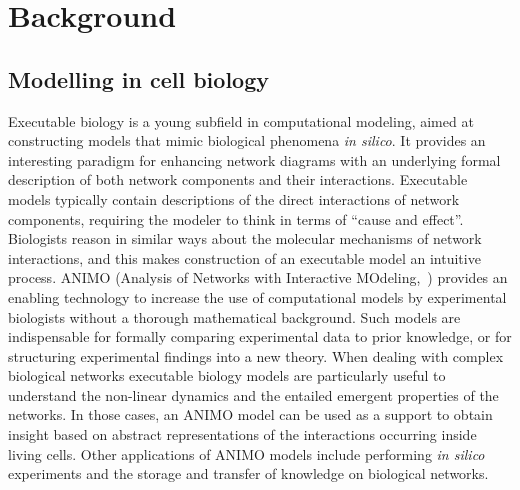 \documentclass{bmcart}
\begin{document}
\section*{Background}\label{sec:introduction}
\subsection*{Modelling in cell biology}
Executable biology is a young subfield in computational modeling, aimed at constructing models that mimic
biological phenomena \emph{in silico}. It provides an interesting paradigm for enhancing network
diagrams with an underlying formal description of both network components and their interactions.
Executable models typically contain descriptions of the direct interactions of network components,
requiring the modeler to think in terms of
``cause and effect''. Biologists reason in similar ways about the molecular mechanisms of network
interactions, and this makes construction of an executable model an intuitive process.
ANIMO (Analysis of Networks with Interactive MOdeling,~\cite{animo-ieee,animo-gene})
provides an enabling technology to increase the use of computational models by experimental
 biologists without a thorough mathematical background. Such models are indispensable for formally
comparing experimental data to prior knowledge, or for structuring experimental findings into a
new theory.
When dealing with complex biological networks executable biology models are particularly useful
to understand the non-linear dynamics and the entailed emergent properties of the networks.
In those cases, an ANIMO model can be used as a support to obtain insight based on abstract
representations of the interactions occurring inside living cells.
Other applications of ANIMO models include performing \emph{in silico} experiments and
the storage and transfer of knowledge on biological networks.
\end{document}
